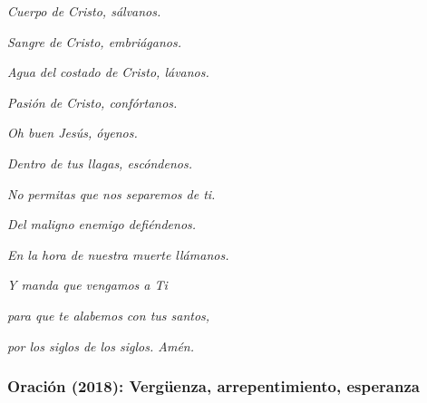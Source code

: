			\begin{bodyprose}\textit{Cuerpo de Cristo, sálvanos.}\end{bodyprose}
			
			\begin{bodyprose}\textit{Sangre de Cristo, embriáganos.}\end{bodyprose}
			
			\begin{bodyprose}\textit{Agua del costado de Cristo, lávanos.}\end{bodyprose}
			
			\begin{bodyprose}\textit{Pasión de Cristo, confórtanos.}\end{bodyprose}
			
			\begin{bodyprose}\textit{Oh buen Jesús, óyenos.}\end{bodyprose}
			
			\begin{bodyprose}\textit{Dentro de tus llagas, escóndenos.}\end{bodyprose}
			
			\begin{bodyprose}\textit{No permitas que nos separemos de ti.}\end{bodyprose}
			
			\begin{bodyprose}\textit{Del maligno enemigo defiéndenos.}\end{bodyprose}
			
			\begin{bodyprose}\textit{En la hora de nuestra muerte llámanos.}\end{bodyprose}
			
			\begin{bodyprose}\textit{Y manda que vengamos a Ti }\end{bodyprose}
			
			\begin{bodyprose}\textit{para que te alabemos con tus santos,}\end{bodyprose}
			
			\begin{bodyprose}\textit{por los siglos de los siglos. Amén.}\end{bodyprose}
			
			\subsubsection{Oración (2018): Vergüenza, arrepentimiento, esperanza}
			
